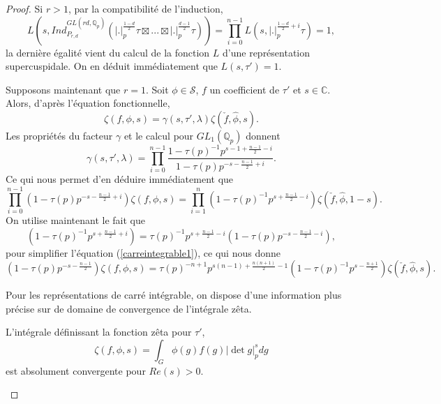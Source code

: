 \begin{proof}
Si $r > 1$, par la compatibilité de l'induction,
\begin{equation}
L(s, Ind_{P_{r,d}}^{GL(rd, \mathbb{Q}_p)}(|.|_p^{\frac{1-d}{2}}\tau \boxtimes ... \boxtimes |.|_p^{\frac{d-1}{2}}\tau)) = \prod_{i=0}^{n-1} L(s, |.|_p^{\frac{1-d}{2}+i}\tau)=1,
\end{equation}
la dernière égalité vient du calcul de la fonction $L$ d'une représentation supercuspidale. On en déduit immédiatement que $L(s,\tau')=1$.

Supposons maintenant que $r=1$. Soit $\phi \in \mathcal{S}$, $f$ un coefficient de $\tau'$ et $s \in \mathbb{C}$. Alors, d'après l'équation fonctionnelle,
\begin{equation}
\zeta(f, \phi, s) = \gamma(s, \tau', \lambda)\zeta(\check{f}, \hat{\phi}, s).
\end{equation}
Les propriétés du facteur $\gamma$ et le calcul pour $GL_1(\mathbb{Q}_p)$ donnent
\begin{equation}
\gamma(s, \tau', \lambda) = \prod_{i=0}^{n-1} \frac{1-\tau(p)^{-1}p^{s-1+\frac{n-1}{2}-i}}{1-\tau(p)p^{-s-\frac{n-1}{2}+i}}.
\end{equation}
Ce qui nous permet d'en déduire immédiatement que
\begin{equation}
\label{carreintegrable1}
\prod_{i=0}^{n-1}(1-\tau(p)p^{-s-\frac{n-1}{2}+i})\zeta(f, \phi, s) =
\prod_{i=1}^{n}(1-\tau(p)^{-1}p^{s+\frac{n-1}{2}-i})\zeta(\check{f}, \hat{\phi}, 1-s).
\end{equation}
On utilise maintenant le fait que
\begin{equation}
(1-\tau(p)^{-1}p^{s+\frac{n-1}{2}+i}) = \tau(p)^{-1}p^{s+\frac{n-1}{2}-i}(1-\tau(p)p^{-s-\frac{n-1}{2}-i}),
\end{equation}
pour simplifier l'équation (\ref{carreintegrable1}), ce qui nous donne
\begin{equation}
\label{carreintegrable2}
(1-\tau(p)p^{-s-\frac{n-1}{2}})\zeta(f, \phi, s) = \tau(p)^{-n+1}
p^{s(n-1)+\frac{n(n+1)}{2}-1}(1-\tau(p)^{-1}p^{s-\frac{n+1}{2}})\zeta(\check{f}, \hat{\phi}, s).
\end{equation}

Pour les représentations de carré intégrable, on dispose d'une information plus précise sur de domaine de convergence de l'intégrale zêta.
\begin{lemme}
L'intégrale définissant la fonction zêta pour $\tau'$,
\begin{equation}
\zeta(f, \phi, s) = \int_{G} \phi(g)f(g)|\det g|_p^s dg
\end{equation}
est absolument convergente pour $Re(s) > 0$.
\end{lemme}


\end{proof}
